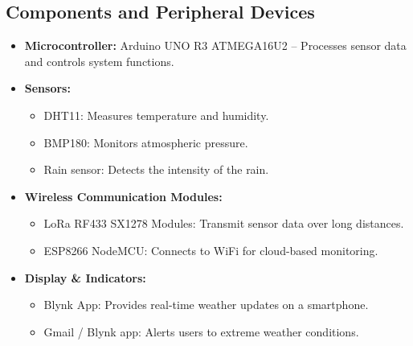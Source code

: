 \documentclass[conference, onecolumn]{IEEEtran}
\begin{document}
\subsection{Components and Peripheral Devices}
\begin{itemize}
    \item \textbf{Microcontroller:} Arduino UNO R3 ATMEGA16U2 – Processes sensor data and controls system functions.
    \item \textbf{Sensors:}
    \begin{itemize}
        \item DHT11: Measures temperature and humidity.
        \item BMP180: Monitors atmospheric pressure.
        \item Rain sensor: Detects the intensity of the rain.
    \end{itemize}
    \item \textbf{Wireless Communication Modules:}
    \begin{itemize}
        \item LoRa RF433 SX1278 Modules: Transmit sensor data over long distances.
        \item ESP8266 NodeMCU: Connects to WiFi for cloud-based monitoring.
    \end{itemize}
    \item \textbf{Display \& Indicators:}
    \begin{itemize}
        \item Blynk App: Provides real-time weather updates on a smartphone.
        \item Gmail / Blynk app: Alerts users to extreme weather conditions.
    \end{itemize}
\end{itemize}
\end{document}
